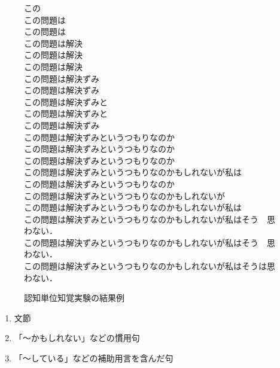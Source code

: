 \begin{figure}
\begin{flushleft}
\small
{} この\\
 この問題は\\
 この問題は\\
 この問題は解決\\
 この問題は解決\\
 この問題は解決\\
 この問題は解決ずみ\\
 この問題は解決ずみ\\
 この問題は解決ずみと\\
 この問題は解決ずみと\\
 この問題は解決ずみ\\
 この問題は解決ずみというつもりなのか\\
 この問題は解決ずみというつもりなのか\\
 この問題は解決ずみというつもりなのか\\
 この問題は解決ずみというつもりなのかもしれないが私は\\
 この問題は解決ずみというつもりなのか\\
 この問題は解決ずみというつもりなのかもしれないが\\
 この問題は解決ずみというつもりなのかもしれないが私は\\
 この問題は解決ずみというつもりなのかもしれないが私はそう　思わない．\\
 この問題は解決ずみというつもりなのかもしれないが私はそう　思わない．\\
 この問題は解決ずみというつもりなのかもしれないが私はそうは思わない．\\
\end{flushleft}
\caption{認知単位知覚実験の結果例} \label{zu2}
\vspace*{5mm}
\end{figure}

\begin{enumerate}
\item 文節
\item 「〜かもしれない」などの慣用句
\item 「〜している」などの補助用言を含んだ句
\end{enumerate}

